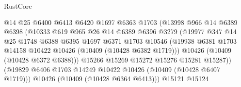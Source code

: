 \begin{lexlean}{RustCore}
\begin{coremodule}
                                  @14
                                  @25
                                  @6400
                                  @6413
                                  @6420
                                  @1697
                                  @6363
                                  @1703
                                  (@13998
                                    @966
                                    @14
                                    @6389
                                    @6398
                                    (@10333
                                      @619
                                      @965
                                      @26
                                      @14
                                      @6389
                                      @6396
                                      @3279
                                      (@19977
                                        @347
                                        @14
                                        @25
                                        @1748
                                        @6388
                                        @6395
                                        @1697
                                        @6371
                                        @1703
                                        @10546
                                        (@19938
                                          @6381
                                          @1703
                                          @14158
                                          @10422
                                          @10426
                                          (@10409 (@10428 @6382 @1719)))
                                        @10426
                                        (@10409 (@10428 @6372 @6388)))
                                      @15266
                                      @15269
                                      @15272
                                      @15276
                                      @15281
                                      @15287))
                                  (@19829
                                    @6406
                                    @1703
                                    @14249
                                    @10422
                                    @10426
                                    (@10409 (@10428 @6407 @1719)))
                                  @10426
                                  (@10409 (@10428 @6364 @6413)))
                                @15121
                                @15124

\end{coremodule}
\end{lexlean}
